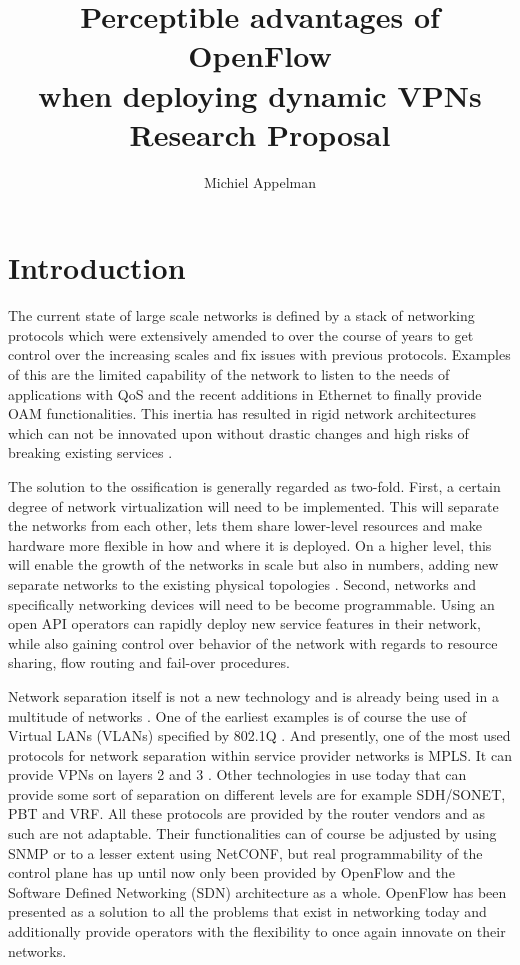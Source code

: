 \documentclass[oneside,twocolumn,8pt,a4paper]{article}
\title{Perceptible advantages of OpenFlow \\
\Large{when deploying dynamic VPNs} \\[0.3cm]
\large{Research Proposal}}
\author{Michiel Appelman}
\begin{document}
	\maketitle
	
	\section{Introduction} %
	\label{sec:introduction}
	The current state of large scale networks is defined by a stack of networking protocols which were extensively amended to over the course of years to get control over the increasing scales and fix issues with previous protocols. 
	Examples of this are the limited capability of the network to listen to the needs of applications with QoS and the recent additions in Ethernet to finally provide OAM functionalities. 
	This inertia has resulted in rigid network architectures which can not be innovated upon without drastic changes and high risks of breaking existing services \cite{diversifiedinternet,overcomingimpasse}.

	The solution to the ossification is generally regarded as two-fold. First, a certain degree of network virtualization will need to be implemented. 
	This will separate the networks from each other, lets them share lower-level resources and make hardware more flexible in how and where it is deployed. 
	On a higher level, this will enable the growth of the networks in scale but also in numbers, adding new separate networks to the existing physical topologies \cite{diversifying}. 
	Second, networks and specifically networking devices will need to be become programmable. 
	Using an open API operators can rapidly deploy new service features in their network, while also gaining control over behavior of the network with regards to resource sharing, flow routing and fail-over procedures. \cite{programmability-answer}

	Network separation itself is not a new technology and is already being used in a multitude of networks \cite{net-virt10}. One of the earliest examples is of course the use of Virtual LANs (VLANs) specified by 802.1Q \cite{dot1q}. And presently, one of the most used protocols for network separation within service provider networks is MPLS. It can provide VPNs on layers 2 and 3 \cite{rfc4664,rfc4364}. Other technologies in use today that can provide some sort of separation on different levels are for example SDH/SONET, PBT and VRF. All these protocols are provided by the router vendors and as such are not adaptable. Their functionalities can of course be adjusted by using SNMP or to a lesser extent using NetCONF, but real programmability of the control plane has up until now only been provided by OpenFlow \cite{openflow} and the Software Defined Networking (SDN) architecture as a whole. OpenFlow has been presented as a solution to all the problems that exist in networking today and additionally provide operators with the flexibility to once again innovate on their networks.
			
\end{document}
